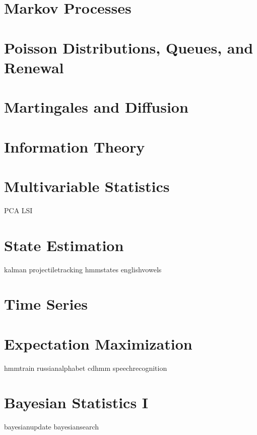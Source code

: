 \documentclass[nociteref]{newsiambook}
\begin{document}
\part{Markov Processes}

\part{Poisson Distributions, Queues, and Renewal}

\part{Martingales and Diffusion}

\part{Information Theory}

\part{Multivariable Statistics}
{PCA}
{LSI}

\part{State Estimation}
{kalman}
{projectiletracking}
{hmmstates}
{englishvowels}

\part{Time Series}

\part{Expectation Maximization}
{hmmtrain}
{russianalphabet}
{cdhmm}
{speechrecognition}

\part{Bayesian Statistics I}
{bayesianupdate}
{bayesiansearch}
\end{document}
